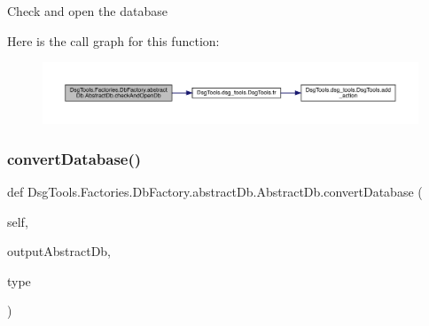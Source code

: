 \begin{DoxyVerb}Check and open the database
\end{DoxyVerb}
 Here is the call graph for this function\+:
\nopagebreak
\begin{figure}[H]
\begin{center}
\leavevmode
\includegraphics[width=350pt]{class_dsg_tools_1_1_factories_1_1_db_factory_1_1abstract_db_1_1_abstract_db_ab522beb68a06f7e325bc10a8c0b5506d_cgraph}
\end{center}
\end{figure}
\mbox{\label{class_dsg_tools_1_1_factories_1_1_db_factory_1_1abstract_db_1_1_abstract_db_af2cfa7cec72d89c8bff648a1ef6fd895}} 
\subsubsection{\texorpdfstring{convert\+Database()}{convertDatabase()}}
{\footnotesize\ttfamily def Dsg\+Tools.\+Factories.\+Db\+Factory.\+abstract\+Db.\+Abstract\+Db.\+convert\+Database (\begin{DoxyParamCaption}\item[{}]{self,  }\item[{}]{output\+Abstract\+Db,  }\item[{}]{type }\end{DoxyParamCaption})}

